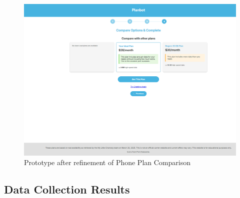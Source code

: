 \documentclass[conference]{IEEEtran}
\begin{document}
\begin{figure}[H]
    \centering
    \includegraphics[width=1\linewidth]{Prototype V2/4-357.png}
    \caption{Prototype after refinement of Phone Plan Comparison}
    \label{fig:user flow}
\end{figure}
\subsection{Data Collection Results}


\end{document}
